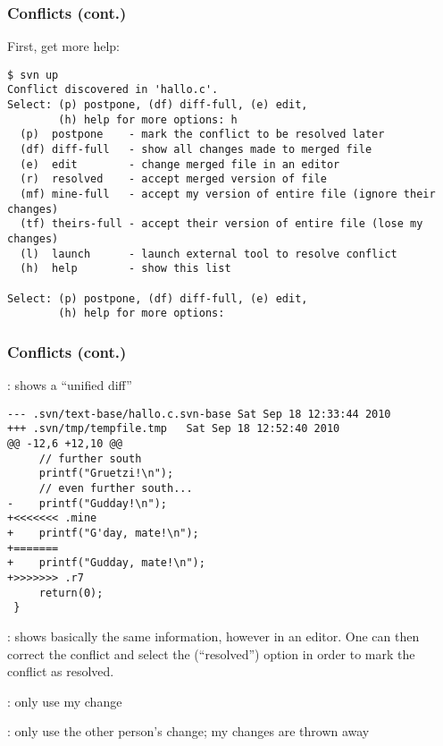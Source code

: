 \begin{frame}[fragile]
    \frametitle{Conflicts (cont.)}
    \linuxframe

First, get more help:
\begin{lstlisting}[basicstyle=\tiny\ttfamily\color{black}]
$ svn up
Conflict discovered in 'hallo.c'.
Select: (p) postpone, (df) diff-full, (e) edit,
        (h) help for more options: h
  (p)  postpone    - mark the conflict to be resolved later
  (df) diff-full   - show all changes made to merged file
  (e)  edit        - change merged file in an editor
  (r)  resolved    - accept merged version of file
  (mf) mine-full   - accept my version of entire file (ignore their changes)
  (tf) theirs-full - accept their version of entire file (lose my changes)
  (l)  launch      - launch external tool to resolve conflict
  (h)  help        - show this list

Select: (p) postpone, (df) diff-full, (e) edit,
        (h) help for more options: 
\end{lstlisting}
\end{frame}

\begin{frame}[fragile]
    \frametitle{Conflicts (cont.)}
    \linuxframe

: shows a \enquote{unified diff}
\begin{lstlisting}[basicstyle=\tiny\ttfamily\color{black}]
--- .svn/text-base/hallo.c.svn-base Sat Sep 18 12:33:44 2010
+++ .svn/tmp/tempfile.tmp   Sat Sep 18 12:52:40 2010
@@ -12,6 +12,10 @@
     // further south
     printf("Gruetzi!\n");
     // even further south...
-    printf("Gudday!\n");
+<<<<<<< .mine
+    printf("G'day, mate!\n");
+=======
+    printf("Gudday, mate!\n");
+>>>>>>> .r7
     return(0);
 }
\end{lstlisting}

: shows basically the same information, however in an editor.
One can then correct the conflict and select the 
(\enquote{resolved}) option in order to mark the conflict as resolved.

: only use my change

: only use the other person's change; my changes are
thrown away
\end{frame}

